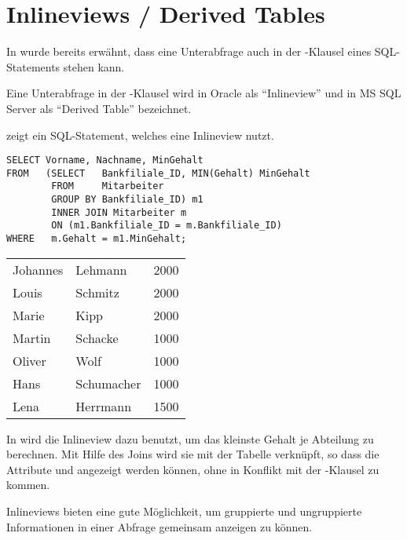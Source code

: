     \section{Inlineviews / Derived Tables}
      In  wurde bereits erw\"ahnt, dass eine Unterabfrage auch in der \FROM-Klausel eines SQL-Statements stehen kann.
      \begin{merke}
        Eine Unterabfrage in der \FROM-Klausel wird in Oracle als \enquote{Inlineview} und in MS SQL Server als \enquote{Derived Table} bezeichnet.
      \end{merke}
       zeigt ein SQL-Statement, welches eine Inlineview nutzt.
      \begin{lstlisting}[language=oracle_sql,caption={Eine Inlineview},label=sql06_10]
SELECT Vorname, Nachname, MinGehalt
FROM   (SELECT   Bankfiliale_ID, MIN(Gehalt) MinGehalt
        FROM     Mitarbeiter
        GROUP BY Bankfiliale_ID) m1
        INNER JOIN Mitarbeiter m
        ON (m1.Bankfiliale_ID = m.Bankfiliale_ID)
WHERE   m.Gehalt = m1.MinGehalt;
      \end{lstlisting}
      \begin{center}
        \begin{small}
          \tablehead{}
          \tabletail {
          }
          \begin{msoraclesql}
            \begin{supertabular}{llr}
              Johannes & Lehmann & 2000 \\
              Louis & Schmitz & 2000 \\
              Marie & Kipp & 2000 \\
              Martin & Schacke & 1000 \\
              Oliver & Wolf & 1000 \\
              Hans & Schumacher & 1000 \\
              Lena & Herrmann & 1500 \\
            \end{supertabular}
          \end{msoraclesql}
        \end{small}
      \end{center}
      In  wird die Inlineview dazu benutzt, um das kleinste Gehalt je Abteilung zu berechnen. Mit Hilfe des Joins wird sie mit der Tabelle  verkn\"upft, so dass die Attribute  und  angezeigt werden k\"onnen, ohne in Konflikt mit der \GROUPBY-Klausel zu kommen.
      \begin{merke}
        Inlineviews bieten eine gute M\"oglichkeit, um gruppierte und ungruppierte Informationen in einer Abfrage gemeinsam anzeigen zu k\"onnen.
      \end{merke}
